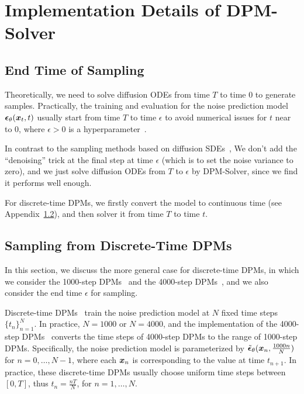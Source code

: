 
\section{Implementation Details of DPM-Solver}
\label{appendix:implementation}


\subsection{End Time of Sampling}
Theoretically, we need to solve diffusion ODEs from time $T$ to time $0$ to generate samples. Practically, the training and evaluation for the noise prediction model $\bm{\epsilon}_\theta(\bm{x}_t,t)$ usually start from time $T$ to time $\epsilon$ to avoid numerical issues for $t$ near to $0$, where $\epsilon>0$ is a hyperparameter~\citep{song2020score}.

In contrast to the sampling methods based on diffusion SDEs~\citep{ho2020denoising,song2020score}, We don't add the ``denoising'' trick at the final step at time $\epsilon$ (which is to set the noise variance to zero), and we just solve diffusion ODEs from $T$ to $\epsilon$ by DPM-Solver, since we find it performs well enough.

For discrete-time DPMs, we firstly convert the model to continuous time (see Appendix~\ref{appendix:discrete}), and then solver it from time $T$ to time $t$.

\subsection{Sampling from Discrete-Time DPMs}
\label{appendix:discrete}
In this section, we discuss the more general case for discrete-time DPMs, in which we consider the 1000-step DPMs~\citep{ho2020denoising} and the 4000-step DPMs~\citep{nichol2021improved}, and we also consider the end time $\epsilon$ for sampling.

Discrete-time DPMs~\citep{ho2020denoising} train the noise prediction model at $N$ fixed time steps $\{t_n\}_{n=1}^N$. In practice, $N=1000$ or $N=4000$, and the implementation of the 4000-step DPMs~\citep{nichol2021improved} converts the time steps of 4000-step DPMs to the range of 1000-step DPMs. Specifically, the noise prediction model is parameterized by $\tilde{\bm{\epsilon}}_\theta(\bm{x}_n, \frac{1000n}{N})$ for $n=0,\dots,N-1$, where each $\bm{x}_n$ is corresponding to the value at time $t_{n+1}$. In practice, these discrete-time DPMs usually choose uniform time steps between $[0,T]$, thus $t_{n}=\frac{nT}{N}$, for $n=1,\dots,N$.

